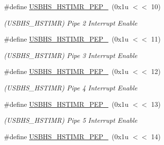 \begin{DoxyCompactItemize}
\mbox{\label{group__SAMS70__USBHS_ga9880b7c54d692247c9aba7f4f95c2e15}} 
\#define \mbox{\hyperlink{group__SAMS70__USBHS_ga9880b7c54d692247c9aba7f4f95c2e15}{U\+S\+B\+H\+S\+\_\+\+H\+S\+T\+I\+M\+R\+\_\+\+P\+E\+P\+\_}}~(0x1u $<$$<$ 10)
\begin{DoxyCompactList}\small\item\em (U\+S\+B\+H\+S\+\_\+\+H\+S\+T\+I\+MR) Pipe 2 Interrupt Enable \end{DoxyCompactList}\item 
\mbox{\label{group__SAMS70__USBHS_ga70b559fada4c465d2b6bc299392ae540}} 
\#define \mbox{\hyperlink{group__SAMS70__USBHS_ga70b559fada4c465d2b6bc299392ae540}{U\+S\+B\+H\+S\+\_\+\+H\+S\+T\+I\+M\+R\+\_\+\+P\+E\+P\+\_}}~(0x1u $<$$<$ 11)
\begin{DoxyCompactList}\small\item\em (U\+S\+B\+H\+S\+\_\+\+H\+S\+T\+I\+MR) Pipe 3 Interrupt Enable \end{DoxyCompactList}\item 
\mbox{\label{group__SAMS70__USBHS_ga26cb041dc277bbef3b58e0202ab628f8}} 
\#define \mbox{\hyperlink{group__SAMS70__USBHS_ga26cb041dc277bbef3b58e0202ab628f8}{U\+S\+B\+H\+S\+\_\+\+H\+S\+T\+I\+M\+R\+\_\+\+P\+E\+P\+\_}}~(0x1u $<$$<$ 12)
\begin{DoxyCompactList}\small\item\em (U\+S\+B\+H\+S\+\_\+\+H\+S\+T\+I\+MR) Pipe 4 Interrupt Enable \end{DoxyCompactList}\item 
\mbox{\label{group__SAMS70__USBHS_gaceb5d8500512986ef44bafafe5f5aaa5}} 
\#define \mbox{\hyperlink{group__SAMS70__USBHS_gaceb5d8500512986ef44bafafe5f5aaa5}{U\+S\+B\+H\+S\+\_\+\+H\+S\+T\+I\+M\+R\+\_\+\+P\+E\+P\+\_}}~(0x1u $<$$<$ 13)
\begin{DoxyCompactList}\small\item\em (U\+S\+B\+H\+S\+\_\+\+H\+S\+T\+I\+MR) Pipe 5 Interrupt Enable \end{DoxyCompactList}\item 
\mbox{\label{group__SAMS70__USBHS_gad408856b09c79f2fda29bd4d14f8ed41}} 
\#define \mbox{\hyperlink{group__SAMS70__USBHS_gad408856b09c79f2fda29bd4d14f8ed41}{U\+S\+B\+H\+S\+\_\+\+H\+S\+T\+I\+M\+R\+\_\+\+P\+E\+P\+\_}}~(0x1u $<$$<$ 14)
$$
\end{DoxyCompactItemize}

